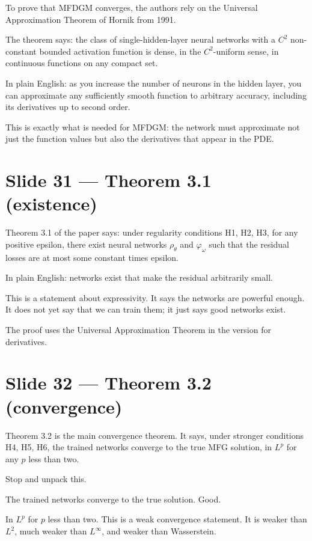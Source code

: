 \documentclass[11pt]{article}
\begin{document}
To prove that MFDGM converges, the authors rely on the Universal
Approximation Theorem of Hornik from 1991.

The theorem says: the class of single-hidden-layer neural networks with a
$C^2$ non-constant bounded activation function is dense, in the
$C^2$-uniform sense, in continuous functions on any compact set.

In plain English: as you increase the number of neurons in the hidden
layer, you can approximate any sufficiently smooth function to arbitrary
accuracy, including its derivatives up to second order.

This is exactly what is needed for MFDGM: the network must approximate not
just the function values but also the derivatives that appear in the PDE.

\section*{Slide 31 --- Theorem 3.1 (existence)}

Theorem 3.1 of the paper says: under regularity conditions H1, H2, H3, for
any positive epsilon, there exist neural networks $\rho_\theta$ and
$\varphi_\omega$ such that the residual losses are at most some constant
times epsilon.

In plain English: networks exist that make the residual arbitrarily small.

This is a statement about expressivity. It says the networks are powerful
enough. It does not yet say that we can train them; it just says good
networks exist.

The proof uses the Universal Approximation Theorem in the version for
derivatives.

\section*{Slide 32 --- Theorem 3.2 (convergence)}

Theorem 3.2 is the main convergence theorem. It says, under stronger
conditions H4, H5, H6, the trained networks converge to the true MFG
solution, in $L^p$ for any $p$ less than two.

Stop and unpack this.

The trained networks converge to the true solution. Good.

In $L^p$ for $p$ less than two. This is a weak convergence statement. It is
weaker than $L^2$, much weaker than $L^\infty$, and weaker than Wasserstein.
\end{document}
